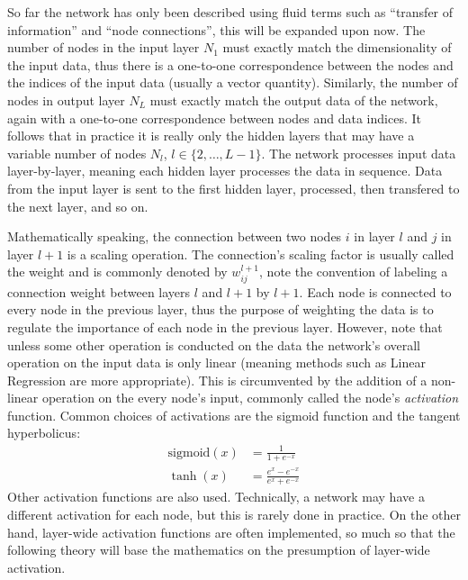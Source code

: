 \documentclass[nofootinbib,reprint,english]{revtex4-1}
\begin{document}
So far the network has only been described using fluid terms such as ``transfer of information'' and ``node connections'', this will be expanded upon now. The number of nodes in the input layer \(N_1\) must exactly match the dimensionality of the input data, thus there is a one-to-one correspondence between the nodes and the indices of the input data (usually a vector quantity). Similarly, the number of nodes in output layer \(N_L\) must exactly match the output data of the network, again with a one-to-one correspondence between nodes and data indices. It follows that in practice it is really only the hidden layers that may have a variable number of nodes \(N_l\), \(l\in\{2,\ldots,L-1\}\). The network processes input data layer-by-layer, meaning each hidden layer processes the data in sequence. Data from the input layer is sent to the first hidden layer, processed, then transfered to the next layer, and so on.

Mathematically speaking, the connection between two nodes \(i\) in layer \(l\) and \(j\) in layer \(l+1\) is a scaling operation. The connection's scaling factor is usually called the weight and is commonly denoted by \(w_{ij}^{l+1}\), note the convention of labeling a connection weight between layers \(l\) and \(l+1\) by \(l+1\). Each node is connected to every node in the previous layer, thus the purpose of weighting the data is to regulate the importance of each node in the previous layer. However, note that unless some other operation is conducted on the data the network's overall operation on the input data is only linear (meaning methods such as Linear Regression are more appropriate). This is circumvented by the addition of a non-linear operation on the every node's input, commonly called the node's \emph{activation} function. Common choices of activations are the sigmoid function and the tangent hyperbolicus:
\begin{subequations}
\begin{align}
\text{sigmoid}(x)&=\frac{1}{1+e^{-x}}\\
\tanh(x)&=\frac{e^x-e^{-x}}{e^x+e^{-x}}
\end{align}
\end{subequations}
Other activation functions are also used. Technically, a network may have a different activation for each node, but this is rarely done in practice. On the other hand, layer-wide activation functions are often implemented, so much so that the following theory will base the mathematics on the presumption of layer-wide activation.
\end{document}
